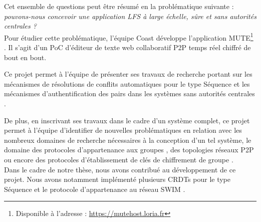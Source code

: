 Cet ensemble de questions peut être résumé en la problématique suivante : \emph{pouvons-nous concevoir une application \ac{LFS} à large échelle, sûre et sans autorités centrales ?}\\

Pour étudier cette problématique, l'équipe Coast développe l'application \acf{MUTE}\footnote{Disponible à l'adresse : \url{https://mutehost.loria.fr}} \cite{MUTE2017}.
Il s'agit d'un \ac{PoC} d'éditeur de texte web collaboratif \ac{P2P} temps réel chiffré de bout en bout.

Ce projet permet à l'équipe de présenter ses travaux de recherche portant sur les mécanismes de résolutions de conflits automatiques pour le type Séquence \cite{2013-logootsplit,2021-these-vic,2022-rls-tpds-nicolas} et les mécanismes d'authentification des pairs dans les systèmes sans autorités centrales \cite{2018-trusternity-short,2018-trusternity-long}.

De plus, en inscrivant ses travaux dans le cadre d'un système complet, ce projet permet à l'équipe d'identifier de nouvelles problématiques en relation avec les nombreux domaines de recherche nécessaires à la conception d'un tel système, \ie le domaine des protocoles d'appartenance aux groupes \cite{swim2002, lifeguard2018}, des topologies réseaux \ac{P2P} \cite{2018-spray-nedelec} ou encore des protocoles d'établissement de clés de chiffrement de groupe \cite{1995-burmester-desmedt}.\\

Dans le cadre de notre thèse, nous avons contribué au développement de ce projet.
Nous avons notamment implémenté plusieurs \acp{CRDT} pour le type Séquence \cite{2013-logootsplit,2022-rls-tpds-nicolas} et le protocole d'appartenance au réseau SWIM \cite{swim2002}.
